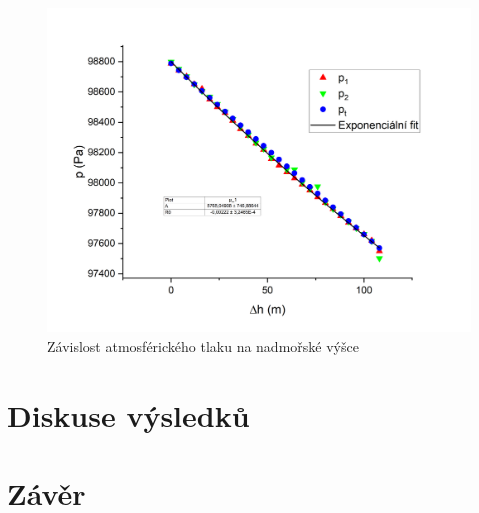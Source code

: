 \begin{figure}[h]
    \centering
    \includegraphics[width=1\linewidth]{Y1 - Závislost atmosférického tlaku na výšce – výletní//Protokol - závislost atmosférického tlaku na výšce – výletní//img/Závislost tlaku na výšce.png}
    \caption{Závislost atmosférického tlaku na nadmořské výšce}
    \label{fig:tlak-na-vysce}
\end{figure}
    
\section{Diskuse výsledků}

\section{Závěr}
